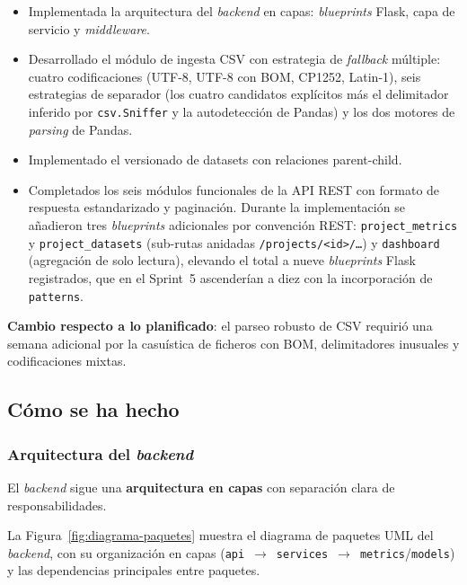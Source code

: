 \begin{itemize}
  \item Implementada la arquitectura del \emph{backend} en capas: \emph{blueprints}
    Flask, capa de servicio y \emph{middleware}.
  \item Desarrollado el módulo de ingesta \ac{CSV} con estrategia de
    \emph{fallback} múltiple: cuatro codificaciones (UTF-8, UTF-8 con
    \ac{BOM}, CP1252, Latin-1), seis estrategias de separador (los cuatro
    candidatos explícitos más el delimitador inferido por
    \texttt{csv.Sniffer} y la autodetección de Pandas) y los dos motores
    de \emph{parsing} de Pandas.
  \item Implementado el versionado de datasets con relaciones parent-child.
  \item Completados los seis módulos funcionales de la \ac{API} \ac{REST}
    con formato de respuesta estandarizado y paginación.  Durante la
    implementación se añadieron tres \emph{blueprints} adicionales por
    convención \ac{REST}: \texttt{project\_metrics} y \texttt{project\_datasets}
    (sub-rutas anidadas \texttt{/projects/<id>/…}) y \texttt{dashboard}
    (agregación de solo lectura), elevando el total a nueve \emph{blueprints}
    Flask registrados, que en el Sprint~5 ascenderían a diez con la
    incorporación de \texttt{patterns}.
\end{itemize}

\textbf{Cambio respecto a lo planificado}: el parseo robusto de \ac{CSV}
requirió una semana adicional por la casuística de ficheros con \ac{BOM},
delimitadores inusuales y codificaciones mixtas.

\subsection{Cómo se ha hecho}

\subsubsection{Arquitectura del \emph{backend}}
\label{sec:arq-backend}

El \emph{backend} sigue una \textbf{arquitectura en capas} con separación
clara de responsabilidades.

La Figura~\ref{fig:diagrama-paquetes} muestra el diagrama de paquetes
\ac{UML} del \emph{backend}, con su organización en capas
(\texttt{api}~$\to$~\texttt{services}~$\to$~\texttt{metrics}/\texttt{models})
y las dependencias principales entre paquetes.

